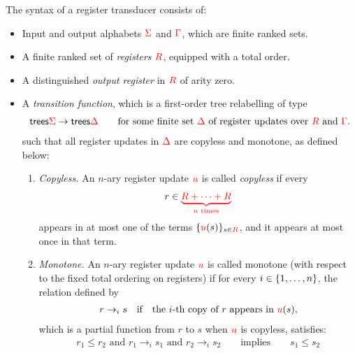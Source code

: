\begin{definition}\label{def:stt}
The syntax of a register transducer consists of: 
\begin{itemize}
    \item Input and output alphabets ${\color{red}{\Sigma}}$ and ${\color{red}{\Gamma}}$, which are finite ranked sets.
    \item A finite ranked set of \emph{registers} ${{\color{red}{R}}}$, equipped with a total order.
    \item A distinguished \emph{output register} in ${{\color{red}{R}}}$ of arity zero.
    \item A \emph{transition function}, which is a  first-order tree relabelling of type
    \begin{align*}
      \mathsf {trees}{{\color{red}{\Sigma}}} \to \mathsf {trees}{{\color{red}{\Delta}}}  \qquad \text{for some finite set ${\color{red}{\Delta}}$ of  register updates over ${{\color{red}{R}}}$ and ${\color{red}{\Gamma}}$}.
    \end{align*}
    such that all register updates in  ${\color{red}{\Delta}}$ are copyless and monotone, as defined below:
    \begin{enumerate}
        \item \emph{Copyless.}  An $n$-ary register update ${\color{red}{u}}$ is  called  \emph{copyless} if   every
        \begin{align*}
            r \in {\color{red}{\underbrace{{{\color{red}{R}}}+ \cdots + {{\color{red}{R}}}}_{\text{$n$ times}}}}
        \end{align*}
        appears in at most one of the terms $\{{\color{red}{u}}(s)\}_{s \in {{\color{red}{R}}}}$, and it appears at most once in that term. 
        \item \emph{Monotone.} An $n$-ary  register update ${\color{red}{u}}$ is called monotone (with respect to the fixed total ordering on registers) if for every $i \in \{1,\ldots,n\}$, the relation defined by
        \begin{align*} 
            r \to_i s \quad \text{if} \quad  \text{the $i$-th copy of $r$ appears in ${\color{red}{u}}(s)$},
        \end{align*}
        which is a partial function from $r$ to $s$ when ${\color{red}{u}}$ is copyless, satisfies:
        \begin{align*}
            r_1 \leq r_2 \text{ and } r_1 \to_i s_1 \text{ and } r_2 \to_i s_2  \qquad \text{implies} \qquad  s_1 \leq s_2
        \end{align*}
    \end{enumerate}
\end{itemize}
\end{definition}

